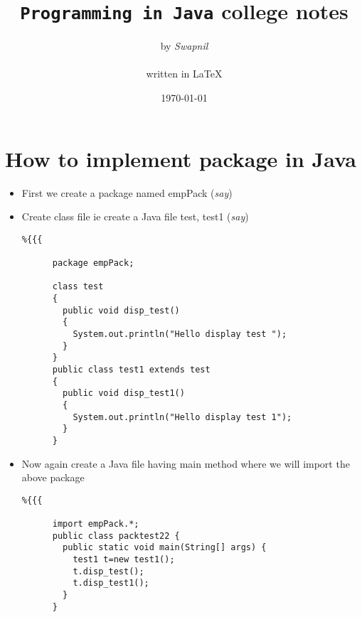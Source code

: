 \documentclass[11pt, a4paper, oneside]{book}
\title{\Huge{\texttt{Programming in Java}} \large{college notes}}
\author{\huge{by \emph{Swapnil}}\\ \\ \Large{written in {\LaTeX}}}
\date{\today}
\begin{document}

      \maketitle
      \thispagestyle{empty}

      \setcounter{tocdepth}{3}
      \tableofcontents



\section{How to implement package in Java}
\begin{itemize}
  \item First we create a package named empPack (\textit{say})
  \item Create class file ie create a Java file test, test1 (\textit{say})
    \begin{lstlisting}%{{{

      package empPack;

      class test
      {
        public void disp_test()
        {
          System.out.println("Hello display test ");
        }
      }
      public class test1 extends test
      {
        public void disp_test1()
        {
          System.out.println("Hello display test 1");
        }
      }
    \end{lstlisting}%

  \item Now again create a Java file having main method where we will
    import the above package
    \begin{lstlisting}%{{{

      import empPack.*;
      public class packtest22 {
        public static void main(String[] args) {
          test1 t=new test1();
          t.disp_test();
          t.disp_test1();
        }
      }
    \end{lstlisting}%

\end{itemize}
\end{document}
